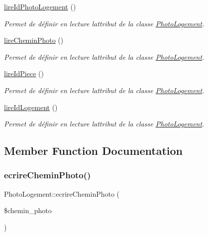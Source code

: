 \begin{DoxyCompactItemize}
\hyperlink{class_photo_logement_a8e7af1076fe6deeae2e801e6e8219233}{lire\+Id\+Photo\+Logement} ()
\begin{DoxyCompactList}\small\item\em Permet de définir en lecture l\textquotesingle{}attribut de la classe \hyperlink{class_photo_logement}{Photo\+Logement}. \end{DoxyCompactList}\item 
\hyperlink{class_photo_logement_aac70000e77a33e19fb64a77485853810}{lire\+Chemin\+Photo} ()
\begin{DoxyCompactList}\small\item\em Permet de définir en lecture l\textquotesingle{}attribut de la classe \hyperlink{class_photo_logement}{Photo\+Logement}. \end{DoxyCompactList}\item 
\hyperlink{class_photo_logement_a7681440c228210689b2bcc599c44f025}{lire\+Id\+Piece} ()
\begin{DoxyCompactList}\small\item\em Permet de définir en lecture l\textquotesingle{}attribut de la classe \hyperlink{class_photo_logement}{Photo\+Logement}. \end{DoxyCompactList}\item 
\hyperlink{class_photo_logement_a81e1b7121f9bfb353fd6c80238d3d25a}{lire\+Id\+Logement} ()
\begin{DoxyCompactList}\small\item\em Permet de définir en lecture l\textquotesingle{}attribut de la classe \hyperlink{class_photo_logement}{Photo\+Logement}. \end{DoxyCompactList}\end{DoxyCompactItemize}


\subsection{Member Function Documentation}
\mbox{\label{class_photo_logement_ad5c888eb9b577273febb80af601e3ef2}} 
\subsubsection{\texorpdfstring{ecrire\+Chemin\+Photo()}{ecrireCheminPhoto()}}
{\footnotesize\ttfamily Photo\+Logement\+::ecrire\+Chemin\+Photo (\begin{DoxyParamCaption}\item[{}]{\$chemin\+\_\+photo }\end{DoxyParamCaption})}




